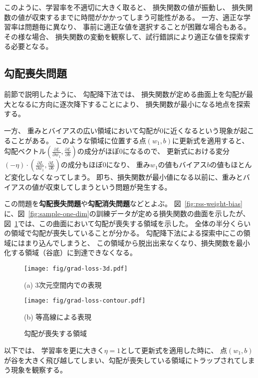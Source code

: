 このように、学習率を不適切に大きく取ると、
損失関数の値が振動し、
損失関数の値が収束するまでに時間がかかってしまう可能性がある。
一方、適正な学習率は問題毎に異なり、
事前に適正な値を選択することが困難な場合もある。
その様な場合、
損失関数の変動を観察して、試行錯誤により適正な値を探索する必要となる。

\subsection{勾配喪失問題}
\label{sec:grad-loss-problem}

前節で説明したように、
勾配降下法では、
損失関数が定める曲面上を勾配が最大となるに方向に逐次降下することにより、
損失関数が最小になる地点を探索する。

一方、
重みとバイアスの広い領域において勾配が0に近くなるという現象が起こることがある。
このような領域に位置する点$(w_1, b)$に更新式を適用すると、
勾配ベクトル$\left(\frac{\partial L}{\partial w_1}, \frac{\partial L}{\partial b}\right)$の成分がほぼ0になるので、
更新式における変分$(-\eta)\cdot\left(\frac{\partial L}{\partial w_1}, \frac{\partial L}{\partial b}\right)$の成分もほぼ0になり、
重み$w_1$の値もバイアス$b$の値もほとんど変化しなくなってしまう。
即ち、損失関数が最小値になる以前に、重みとバイアスの値が収束してしまうという問題が発生する。

この問題を\textbf{勾配喪失問題}や\textbf{勾配消失問題}などとよぶ。
図~\ref{fig:rss-weight-bias}に、図~\ref{fig:sample-one-dim}の訓練データが定める損失関数の曲面を示したが、
図~\ref{fig:grad-loss}では、この曲面において勾配が喪失する領域を示した。
全体の半分くらいの領域で勾配が喪失していることが分かる。
勾配降下法による探索中にこの領域にはまり込んでしまうと、
この領域から脱出出来なくなり、損失関数を最小化する領域（谷底）に到達できなくなる。

\begin{figure}
  \centering

  \texttt{[image: fig/grad-loss-3d.pdf]}

  (a) 3次元空間内での表現

  \texttt{[image: fig/grad-loss-contour.pdf]}

  (b) 等高線による表現

  \caption{勾配が喪失する領域}
  \label{fig:grad-loss}
\end{figure}

以下では、
学習率を更に大きく$\eta = 1$として更新式を適用した時に、
点$(w_1, b)$が谷を大きく飛び越してしまい、勾配が喪失している領域にトラップされてしまう現象を観察する。

